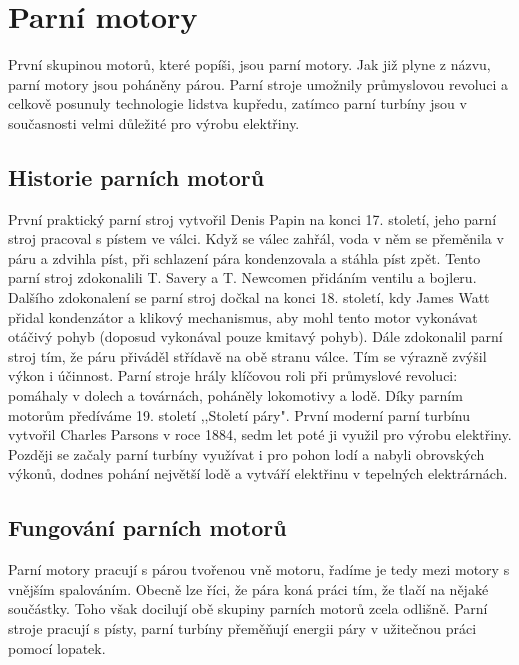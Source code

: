 \section{Parní motory}
{První skupinou motorů, které popíši, jsou parní motory. Jak již plyne z názvu, parní motory jsou poháněny párou. Parní stroje umožnily průmyslovou revoluci a celkově posunuly technologie lidstva kupředu, zatímco parní turbíny jsou v současnosti velmi důležité pro výrobu elektřiny.}

\subsection{Historie parních motorů}
{První praktický parní stroj vytvořil Denis Papin na konci 17. století, jeho parní stroj pracoval s pístem ve válci. Když se válec zahřál, voda v něm se přeměnila v páru a zdvihla píst, při schlazení pára kondenzovala a stáhla píst zpět. Tento parní stroj zdokonalili T. Savery a T. Newcomen přidáním ventilu a bojleru. Dalšího zdokonalení se parní stroj dočkal na konci 18. století, kdy James Watt přidal kondenzátor a klikový mechanismus, aby mohl tento motor vykonávat otáčivý pohyb (doposud vykonával pouze kmitavý pohyb). Dále zdokonalil parní stroj tím, že páru přiváděl střídavě na obě stranu válce. Tím se výrazně zvýšil výkon i účinnost. Parní stroje hrály klíčovou roli při průmyslové revoluci: pomáhaly v dolech a továrnách, poháněly lokomotivy a lodě. Díky parním motorům předíváme 19. století ,,Století páry".}
\cite{st:parniStroj}\odst
{První moderní parní turbínu vytvořil Charles Parsons v roce 1884, sedm let poté ji využil pro výrobu elektřiny. Později se začaly parní turbíny využívat i pro pohon lodí a nabyli obrovských výkonů, dodnes pohání největší lodě a vytváří elektřinu v tepelných elektrárnách.}
\cite{SA:SteamTurbines}

\subsection{Fungování parních motorů}
{Parní motory pracují s párou tvořenou vně motoru, řadíme je tedy mezi motory s vnějším spalováním. Obecně lze říci, že pára koná práci tím, že tlačí na nějaké součástky. Toho však docilují obě skupiny parních motorů zcela odlišně. Parní stroje pracují s písty, parní turbíny přeměňují energii páry v užitečnou práci pomocí lopatek.}

